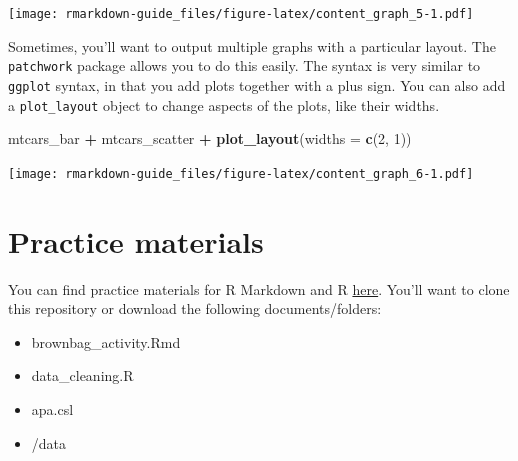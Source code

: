 \documentclass[
]{book}
\newenvironment{Shaded}{\begin{snugshade}}{\end{snugshade}}
\newcommand{\DataTypeTok}[1]{\textcolor[rgb]{0.13,0.29,0.53}{#1}}
\newcommand{\DecValTok}[1]{\textcolor[rgb]{0.00,0.00,0.81}{#1}}
\newcommand{\KeywordTok}[1]{\textcolor[rgb]{0.13,0.29,0.53}{\textbf{#1}}}
\newcommand{\NormalTok}[1]{#1}
\newcommand{\OperatorTok}[1]{\textcolor[rgb]{0.81,0.36,0.00}{\textbf{#1}}}
\newcommand{\StringTok}[1]{\textcolor[rgb]{0.31,0.60,0.02}{#1}}
\providecommand{\tightlist}{%
  \setlength{\itemsep}{0pt}\setlength{\parskip}{0pt}}
\begin{document}
\texttt{[image: rmarkdown-guide\_files/figure-latex/content\_graph\_5-1.pdf]}

Sometimes, you'll want to output multiple graphs with a particular layout. The \texttt{patchwork} package allows you to do this easily. The syntax is very similar to \texttt{ggplot} syntax, in that you add plots together with a plus sign. You can also add a \texttt{plot\_layout} object to change aspects of the plots, like their widths.

\begin{Shaded}
\begin{Highlighting}[]
\NormalTok{ mtcars_bar }\OperatorTok{+}\StringTok{ }\NormalTok{mtcars_scatter }\OperatorTok{+}\StringTok{ }\KeywordTok{plot_layout}\NormalTok{(}\DataTypeTok{widths =} \KeywordTok{c}\NormalTok{(}\DecValTok{2}\NormalTok{, }\DecValTok{1}\NormalTok{))}
\end{Highlighting}
\end{Shaded}

\texttt{[image: rmarkdown-guide\_files/figure-latex/content\_graph\_6-1.pdf]}

\hypertarget{practice-materials}{%
\section{Practice materials}\label{practice-materials}}

You can find practice materials for R Markdown and R \href{https://github.com/hollzzar/markdown-tutorial}{here}. You'll want to clone this repository or download the following documents/folders:

\begin{itemize}
\tightlist
\item
  brownbag\_activity.Rmd
\item
  data\_cleaning.R
\item
  apa.csl
\item
  /data
\end{itemize}

  
\end{document}

